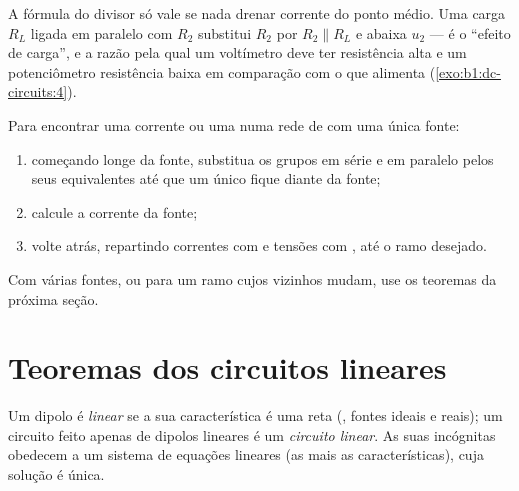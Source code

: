 \begin{remark}\label{rem:b1:dc-circuits:loading}
A fórmula do divisor só vale se nada drenar corrente do
ponto médio. Uma carga $R_L$ ligada em paralelo com $R_2$ substitui $R_2$ por $R_2
\parallel R_L$ e abaixa $u_2$ --- é o ``efeito de carga'', e a
razão pela qual um voltímetro deve ter resistência alta e um potenciômetro
resistência baixa em comparação com o que alimenta
(\cref{exo:b1:dc-circuits:4}).
\end{remark}

\begin{method}\label{met:b1:dc-circuits:reduce}
Para encontrar uma corrente ou uma  numa rede de  com uma única
fonte:
\begin{enumerate}
  \item começando longe da fonte, substitua os grupos em série e em paralelo
        pelos seus equivalentes até que um único  fique diante da
        fonte;
  \item calcule a corrente da fonte;
  \item volte atrás, repartindo correntes com  e
        tensões com , até o ramo desejado.
\end{enumerate}
Com várias fontes, ou para um ramo cujos vizinhos mudam, use
os teoremas da próxima seção.
\end{method}

\section{Teoremas dos circuitos lineares}

\begin{definition}\label{def:b1:dc-circuits:linear}
Um dipolo é \emph{linear} se a sua característica é uma reta
(, fontes ideais e reais); um circuito feito apenas de dipolos
lineares é um \emph{circuito linear}. As suas incógnitas obedecem a um sistema de
equações lineares (as  mais as características), cuja
solução é única.
\end{definition}

